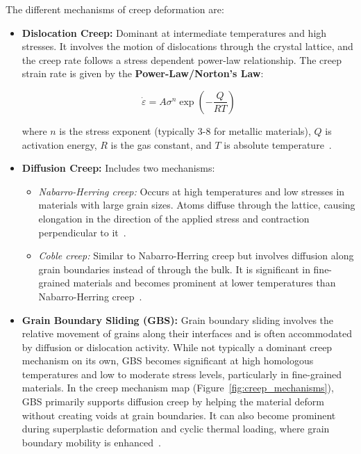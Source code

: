 \documentclass[class=scrbook, crop=false]{standalone}
\begin{document}
The different mechanisms of creep deformation are:
\begin{itemize}
	\item \textbf{Dislocation Creep:}  
	Dominant at intermediate temperatures and high stresses. It involves the motion of dislocations through the crystal lattice, and the creep rate follows a stress dependent power-law relationship. The creep strain rate is given by the \textbf{Power-Law/Norton's Law}:
	
	\begin{equation}
		\dot{\varepsilon} = A \sigma^n \exp\left(-\frac{Q}{RT}\right)
		\label{eq:powerlaw}
	\end{equation}
	
	where $n$ is the stress exponent (typically 3-8 for metallic materials), $Q$ is activation energy, $R$ is the gas constant, and $T$ is absolute temperature~\cite{dieter1986mechanical}.
	
	\item \textbf{Diffusion Creep:}
	Includes two mechanisms:
	\begin{itemize}
		\item \textit{Nabarro-Herring creep:} Occurs at high temperatures and low stresses in materials with large grain sizes. Atoms diffuse through the lattice, causing elongation in the direction of the applied stress and contraction perpendicular to it~\cite{nabarro1948deformation,herring1950diffusional}.
		\item \textit{Coble creep:} Similar to Nabarro-Herring creep but involves diffusion along grain boundaries instead of through the bulk. It is significant in fine-grained materials and becomes prominent at lower temperatures than Nabarro-Herring creep~\cite{coble1963model}.
	\end{itemize}
	
	\item \textbf{Grain Boundary Sliding (GBS):}  
	Grain boundary sliding involves the relative movement of grains along their interfaces and is often accommodated by diffusion or dislocation activity. While not typically a dominant creep mechanism on its own, GBS becomes significant at high homologous temperatures and low to moderate stress levels, particularly in fine-grained materials. In the creep mechanism map (Figure~\ref{fig:creep_mechanisms}), GBS primarily supports diffusion creep by helping the material deform without creating voids at grain boundaries. It can also become prominent during superplastic deformation and cyclic thermal loading, where grain boundary mobility is enhanced~\cite{raj1971grain}.
	

\end{itemize}
\end{document}
